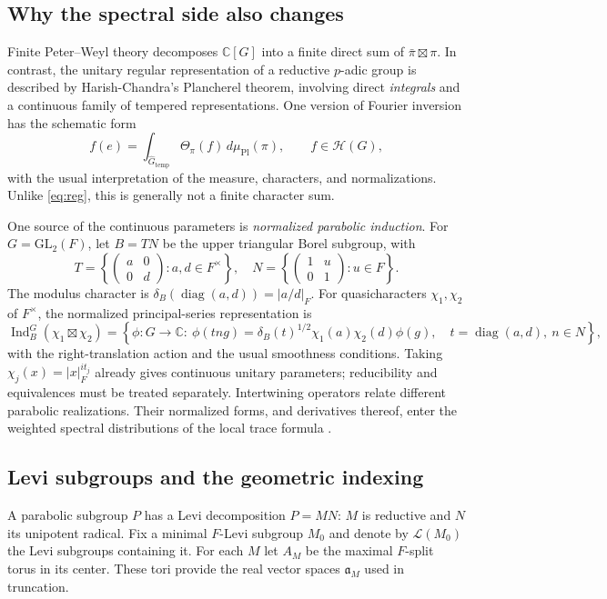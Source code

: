 \documentclass[12pt]{article}
\theoremstyle{remark}
\newcommand{\C}{\mathbb C}
\begin{document}
\subsection{Why the spectral side also changes}
Finite Peter--Weyl theory decomposes $\C[G]$ into a finite direct
sum of $\bar\pi\boxtimes\pi$. In contrast, the unitary regular
representation of a reductive $p$-adic group is described by
Harish-Chandra's Plancherel theorem, involving direct \emph{integrals}
and a continuous family of tempered representations. One version of
Fourier inversion has the schematic form
\begin{equation}\label{eq:padic-plancherel}
 f(e)=\int_{\widehat G_{\mathrm{temp}}}
    \Theta_\pi(f)\,d\mu_{\mathrm{Pl}}(\pi),
 \qquad f\in\mathcal H(G),
\end{equation}
with the usual interpretation of the measure, characters, and
normalizations.  Unlike \eqref{eq:reg}, this is generally not a
finite character sum.

One source of the continuous parameters is \emph{normalized parabolic
induction}. For $G=\mathrm{GL}_2(F)$, let $B=TN$ be the upper
triangular Borel subgroup, with
\[
 T=\left\{\begin{pmatrix}a&0\\0&d\end{pmatrix}:
 a,d\in F^\times\right\},\quad
 N=\left\{\begin{pmatrix}1&u\\0&1\end{pmatrix}:
 u\in F\right\}.
\]
The modulus character is
$\delta_B(\operatorname{diag}(a,d))=|a/d|_F$.
For quasicharacters $\chi_1,\chi_2$ of $F^\times$, the normalized
principal-series representation is
\begin{equation}\label{eq:principal-series}
 \operatorname{Ind}_{B}^{G}
  (\chi_1\boxtimes\chi_2)
 =\left\{\phi:G\to\C:\ 
 \phi(tng)=\delta_B(t)^{1/2}
       \chi_1(a)\chi_2(d)\phi(g),\quad
 t=\operatorname{diag}(a,d),\ n\in N\right\},
\end{equation}
with the right-translation action and the usual smoothness
conditions.  Taking $\chi_j(x)=|x|_F^{it_j}$ already gives
continuous unitary parameters; reducibility and equivalences must
be treated separately.  Intertwining operators relate different
parabolic realizations. Their normalized forms, and derivatives
thereof, enter the weighted spectral distributions of the local
trace formula \cite{Casselman1995,ArthurLocal1991}.

\subsection{Levi subgroups and the geometric indexing}
A parabolic subgroup $P$ has a Levi decomposition $P=MN$:
$M$ is reductive and $N$ its unipotent radical. Fix a minimal
$F$-Levi subgroup $M_0$ and denote by $\mathcal L(M_0)$ the
Levi subgroups containing it.  For each $M$ let $A_M$ be the
maximal $F$-split torus in its center. These tori provide the
real vector spaces $\mathfrak a_M$ used in truncation.
\end{document}
